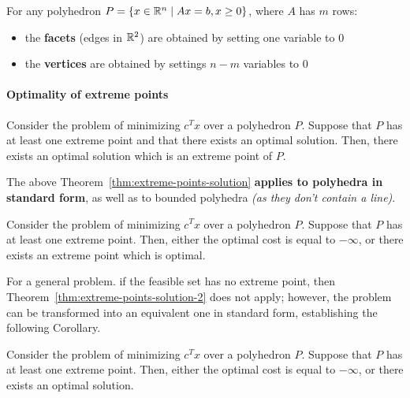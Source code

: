\documentclass[english]{article}
\begin{document}
\bigskip
\begin{property}
  For any polyhedron \(P = \left\{ x \in \mathbb{R}^n \mid   Ax = b, x \geq 0 \right\}\), where \(A\) has \(m\) rows:

  \begin{itemize}
    \item the \textbf{facets} (edges in \(\mathbb{R}^2\)) are obtained by setting one variable to \(0\)
    \item the \textbf{vertices} are obtained by settings \(n-m\) variables to \(0\)
  \end{itemize}
\end{property}

\paragraph{Optimality of extreme points}

\begin{theorem}
  Consider the \LP problem of minimizing \(c^T x\) over a polyhedron \(P\).
  Suppose that \(P\) has at least one extreme point and that there exists an optimal solution.
  Then, there exists an optimal solution which is an extreme point of \(P\).
  \label{thm:extreme-points-solution}
\end{theorem}

The above Theorem~\ref{thm:extreme-points-solution} \textbf{applies to polyhedra in standard form}, as well as to bounded polyhedra \textit{(as they don't contain a line)}.

\begin{theorem}
  Consider the \LP problem of minimizing \(c^T x\) over a polyhedron \(P\).
  Suppose that \(P\) has at least one extreme point.
  Then, either the optimal cost is equal to \(-\infty\), or there exists an extreme point which is optimal.
  \label{thm:extreme-points-solution-2}
\end{theorem}

For a general \LP problem. if the feasible set has no extreme point, then Theorem~\ref{thm:extreme-points-solution-2} does not apply;
however, the problem can be transformed into an equivalent one in standard form, establishing the following Corollary.

\begin{corollary}
  Consider the \LP problem of minimizing \(c^T x\) over a polyhedron \(P\).
  Suppose that \(P\) has at least one extreme point.
  Then, either the optimal cost is equal to \(-\infty\), or there exists an optimal solution.
  \label{cor:extreme-point-solution-2}
\end{corollary}
\end{document}
